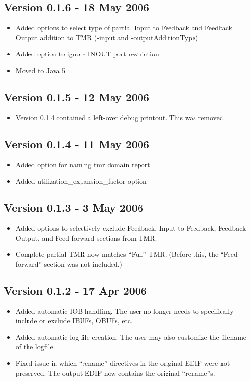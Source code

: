\documentclass[english]{article}
\numberwithin{figure}{section}
\begin{document}
\subsection*{Version 0.1.6 - 18 May 2006}
\begin{itemize}
\item Added options to select type of partial Input to Feedback and Feedback 
Output addition to TMR (-input and -outputAdditionType)
\item Added option to ignore INOUT port restriction
\item Moved to Java 5
\end{itemize}

\subsection*{Version 0.1.5 - 12 May 2006}
\begin{itemize}
\item Version 0.1.4 contained a left-over debug printout. This was removed.
\end{itemize}

\subsection*{Version 0.1.4 - 11 May 2006}
\begin{itemize}
\item Added option for naming tmr domain report
\item Added utilization\_expansion\_factor option
\end{itemize}

\subsection*{Version 0.1.3 - 3 May 2006}
\begin{itemize}
\item Added options to selectively exclude Feedback, Input to Feedback, 
Feedback Output, and Feed-forward sections from TMR.
\item Complete partial TMR now matches ``Full'' TMR\@. (Before this, the 
``Feed-forward'' section was not included.)
\end{itemize}

\subsection*{Version 0.1.2 - 17 Apr 2006}
\begin{itemize}
\item Added automatic IOB handling. The user no longer needs to specifically 
include or exclude IBUFs, OBUFs, etc.
\item Added automatic log file creation. The user may also customize the 
filename of the logfile.
\item Fixed issue in which ``rename'' directives in the original EDIF were not 
preserved. The output EDIF now contains the original ``rename''s.
\end{itemize}
\end{document}
